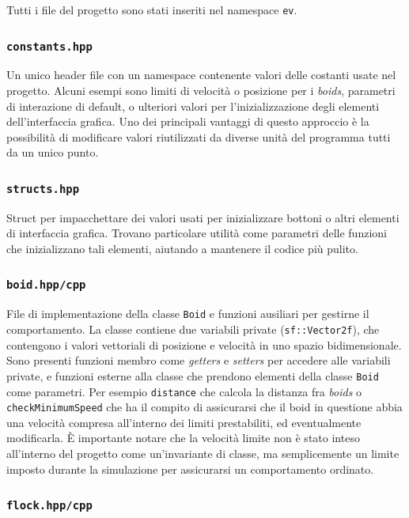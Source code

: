 \documentclass[10pt,a4paper]{article}
\begin{document}
Tutti i file del progetto sono stati inseriti nel namespace \texttt{ev}.

\subsubsection{\texttt{constants.hpp}}

Un unico header file con un namespace contenente valori delle costanti usate nel progetto. Alcuni esempi sono limiti di velocità o posizione per i \textit{boids}, parametri di interazione di default, o ulteriori valori per l'inizializzazione degli elementi dell'interfaccia grafica. Uno dei principali vantaggi di questo approccio è la possibilità di modificare valori riutilizzati da diverse unità del programma tutti da un unico punto.

\subsubsection{\texttt{structs.hpp}}

Struct per impacchettare dei valori usati per inizializzare bottoni o altri elementi di interfaccia grafica. Trovano particolare utilità come parametri delle funzioni che inizializzano tali elementi, aiutando a mantenere il codice più pulito.

\subsubsection{\texttt{boid.hpp/cpp}}

File di implementazione della classe \texttt{Boid} e funzioni ausiliari per gestirne il comportamento. La classe  contiene due variabili private (\texttt{sf::Vector2f}), che contengono i valori vettoriali di posizione e velocità in uno spazio bidimensionale. Sono presenti funzioni membro come \textit{getters} e \textit{setters} per accedere alle variabili private, e funzioni esterne alla classe che prendono elementi della classe \texttt{Boid} come parametri. Per esempio \texttt{distance} che calcola la distanza fra \textit{boids} o \texttt{checkMinimumSpeed} che ha il compito di assicurarsi che il boid in questione abbia una velocità compresa all'interno dei limiti prestabiliti, ed eventualmente modificarla. È importante notare che la velocità limite non è stato inteso all'interno del progetto come un'invariante di classe, ma semplicemente un limite imposto durante la simulazione per assicurarsi un comportamento ordinato.

\subsubsection{\texttt{flock.hpp/cpp}}
\end{document}

